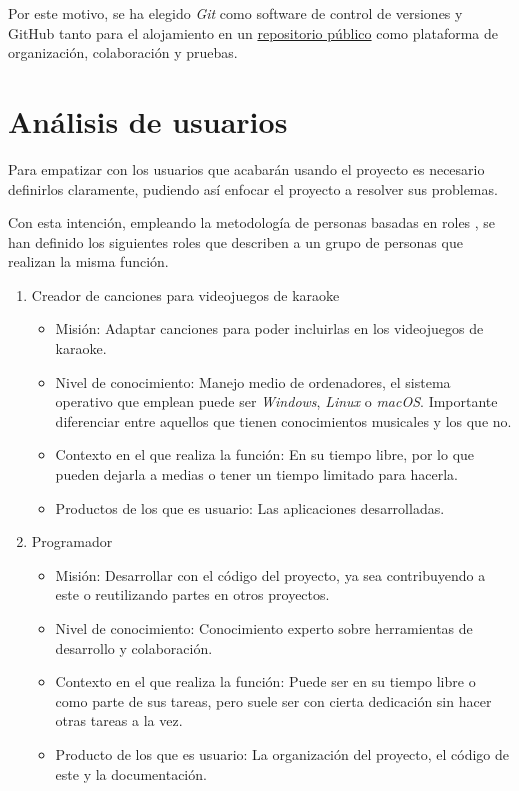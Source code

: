 Por este motivo, se ha elegido \textit{Git} como software de control de versiones y GitHub tanto para el alojamiento en un \href{https://github.com/dipzza/ultrastar-song2txt}{repositorio público} como plataforma de organización, colaboración y pruebas.

\section{Análisis de usuarios}

Para empatizar con los usuarios que acabarán usando el proyecto es necesario definirlos claramente, pudiendo así enfocar el proyecto a resolver sus problemas.

Con esta intención, empleando la metodología de personas basadas en roles \cite{role-personas}, se han definido los siguientes roles que describen a un grupo de personas que realizan la misma función.

\begin{enumerate}	
	\item{Creador de canciones para videojuegos de karaoke}
	\begin{itemize}
		\item{Misión: Adaptar canciones para poder incluirlas en los videojuegos de karaoke.}
		\item{Nivel de conocimiento: Manejo medio de ordenadores, el sistema operativo que emplean puede ser \textit{Windows}, \textit{Linux} o \textit{macOS}. Importante diferenciar entre aquellos que tienen conocimientos musicales y los que no.}
		\item{Contexto en el que realiza la función: En su tiempo libre, por lo que pueden dejarla a medias o tener un tiempo limitado para hacerla.}
		\item{Productos de los que es usuario: Las aplicaciones desarrolladas.}
	\end{itemize}
	
		\item{Programador}
	\begin{itemize}
		\item{Misión: Desarrollar con el código del proyecto, ya sea contribuyendo a este o reutilizando partes en otros proyectos.}
		\item{Nivel de conocimiento: Conocimiento experto sobre herramientas de desarrollo y colaboración.}
		\item{Contexto en el que realiza la función: Puede ser en su tiempo libre o como parte de sus tareas, pero suele ser con cierta dedicación sin hacer otras tareas a la vez.}
		\item{Producto de los que es usuario: La organización del proyecto, el código de este y la documentación.}
	\end{itemize}
\end{enumerate}


